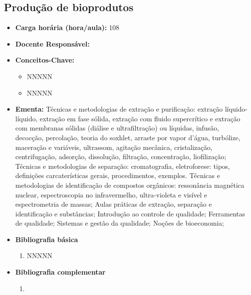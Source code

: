\documentclass[11pt,fleqn]{book} %
\begin{document}
\subsection{Produção de bioprodutos}\label{disc:producao}
\begin{itemize}
	\item \textbf{Carga horária (hora/aula):} 108
	\item \textbf{Docente Responsável:}
	\item \textbf{Conceitos-Chave:}
	\begin{itemize}
		\item NNNNN
		\item NNNNN
	\end{itemize}
	\item \textbf{Ementa:} Técnicas e metodologias de extração e purificação: extração líquido-líquido, extração em fase sólida, extração com fluido supercrítico e extração com membranas sólidas (diálise e ultrafiltração) ou líquidas, infusão, decocção, percolação, teoria do soxhlet, arraste por vapor d’água, turbólize, maceração e variáveis, ultrassom, agitação mecânica, cristalização, centrifugação, adsorção, dissolução, filtração, concentração, liofilização; 
	Técnicas e metodologias de separação: cromatografia, eletroforese: tipos, definições carcaterísticas gerais, procedimentos, exemplos. 
	Técnicas e metodologias de identificação de compostos orgânicos: ressonância magnética nuclear, espectroscopia no infravermelho, ultra-violeta e visível e espectrometria de massas; 
	Aulas práticas de extração, separação e identificação e substâncias;
	Introdução ao controle de qualidade; 
	Ferramentas de qualidade; 
	Sistemas e gestão da qualidade;
	Noções de bioeconomia;
	\item \textbf{Bibliografia básica}
	\begin{enumerate}
		\item NNNNN
	\end{enumerate}
	\item \textbf{Bibliografia complementar}
	\begin{enumerate}
		\item 
	\end{enumerate}	
\end{itemize}



\newpage
\end{document}
